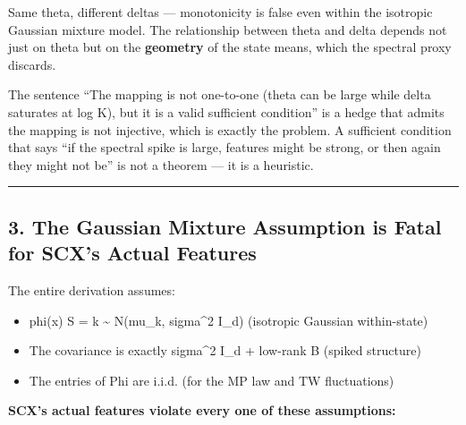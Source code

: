 \documentclass[
  12pt,
]{article}
\providecommand{\tightlist}{%
  \setlength{\itemsep}{0pt}\setlength{\parskip}{0pt}}
\begin{document}
Same theta, different deltas --- monotonicity is false even within the
isotropic Gaussian mixture model. The relationship between theta and
delta depends not just on theta but on the \textbf{geometry} of the
state means, which the spectral proxy discards.

The sentence ``The mapping is not one-to-one (theta can be large while
delta saturates at log K), but it is a valid sufficient condition'' is a
hedge that admits the mapping is not injective, which is exactly the
problem. A sufficient condition that says ``if the spectral spike is
large, features might be strong, or then again they might not be'' is
not a theorem --- it is a heuristic.

\begin{center}\rule{0.5\linewidth}{0.5pt}\end{center}

\subsection{3. The Gaussian Mixture Assumption is Fatal for SCX's Actual
Features}\label{the-gaussian-mixture-assumption-is-fatal-for-scxs-actual-features}

The entire derivation assumes:

\begin{itemize}
\tightlist
\item
  phi(x) \textbar{} S = k \textasciitilde{} N(mu\_k, sigma\^{}2 I\_d)
  (isotropic Gaussian within-state)
\item
  The covariance is exactly sigma\^{}2 I\_d + low-rank B (spiked
  structure)
\item
  The entries of Phi are i.i.d. (for the MP law and TW fluctuations)
\end{itemize}

\textbf{SCX's actual features violate every one of these assumptions:}
\end{document}
